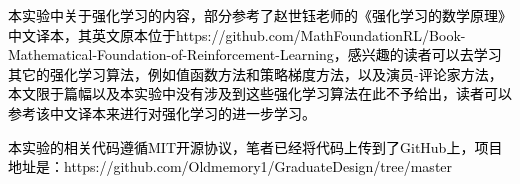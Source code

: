
\begin{appendices}
\textcolor{black}{本实验中关于强化学习的内容，部分参考了赵世钰老师的《强化学习的数学原理》中文译本，其英文原本位于https://github.com/MathFoundationRL/Book-Mathematical-Foundation-of-Reinforcement-Learning，感兴趣的读者可以去学习其它的强化学习算法，例如值函数方法和策略梯度方法，以及演员-评论家方法，本文限于篇幅以及本实验中没有涉及到这些强化学习算法在此不予给出，读者可以参考该中文译本来进行对强化学习的进一步学习。}

\textcolor{black}{本实验的相关代码遵循MIT开源协议，笔者已经将代码上传到了GitHub上，项目地址是：https://github.com/Oldmemory1/GraduateDesign/tree/master }

\end{appendices}
